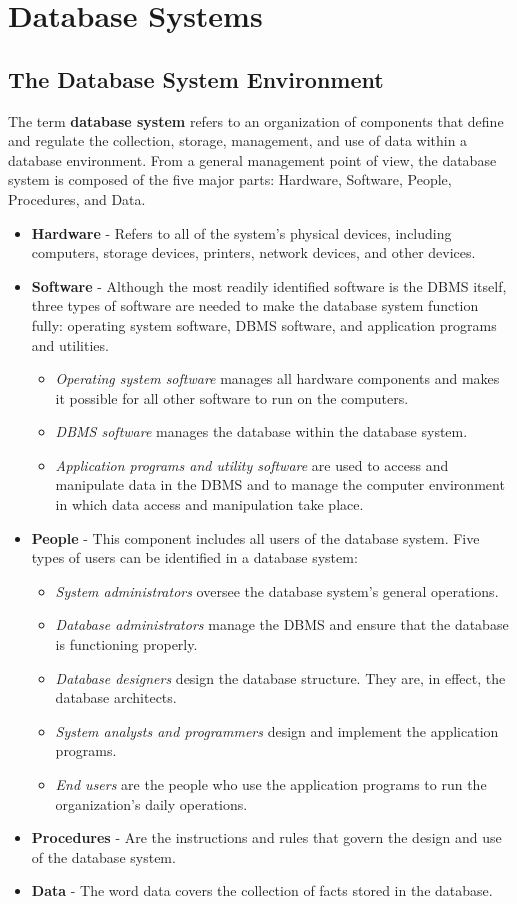 \documentclass[a4paper, 12pt, titlepage]{report}
\begin{document}
\section{Database Systems}
\subsection{The Database System Environment}
The term \textbf{database system} refers to an organization of components that define and regulate the collection, storage, management, and use of data within a database environment. From a general management point of view, the database system is composed of the five major parts: Hardware, Software, People, Procedures, and Data.
\begin{itemize}
\item \textbf{Hardware} - Refers to all of the system’s physical devices, including computers, storage devices, printers, network devices, and other devices.
\item \textbf{Software} - Although the most readily identified software is the DBMS itself, three types of software are needed to make the database system function fully: operating
system software, DBMS software, and application programs and utilities.
\begin{itemize}
\item \emph{Operating system software} manages all hardware components and makes it possible for all other software to run on the computers.
\item \emph{DBMS software} manages the database within the database system.
\item \emph{Application programs and utility software} are used to access and manipulate data in the DBMS and to manage the computer environment in which data access and manipulation take place.
\end{itemize}
\item \textbf{People} - This component includes all users of the database system. Five types of users can be identified in a database system:
\begin{itemize}
\item \emph{System administrators} oversee the database system’s general operations.
\item \emph{Database administrators} manage the DBMS and ensure that the database is functioning properly.
\item \emph{Database designers} design the database structure. They are, in effect, the database architects.
\item \emph{System analysts and programmers} design and implement the application programs.
\item \emph{End users} are the people who use the application programs to run the organization’s daily operations.
\end{itemize}
\item \textbf{Procedures} - Are the instructions and rules that govern the design and use of the database system.
\item \textbf{Data} - The word data covers the collection of facts stored in the database.
\end{itemize}
\pagebreak
\end{document}
